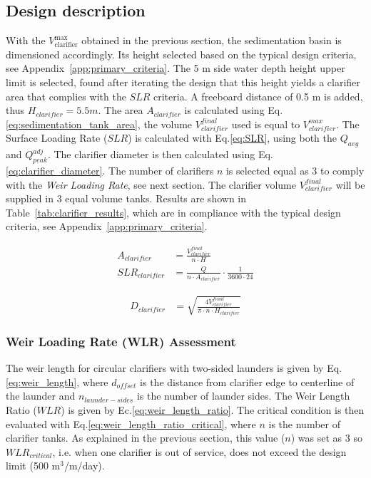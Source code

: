\documentclass[11pt]{article}
\begin{document}
\subsection{Design description}
\label{sec:clarifier_design_description}

With the $V_{\text{clarifier}}^{\text{max}}$ obtained in the previous section, 
the sedimentation basin is dimensioned accordingly. Its height selected based on the typical design criteria, 
see Appendix~\ref{app:primary_criteria}. The 5 m side water depth height upper limit is 
selected, found after iterating the design that this height yields a clarifier 
area that complies with the $SLR$ criteria. A freeboard distance 
of 0.5 m is added, thus $H_{clarifier}=5.5m$. The area $A_{clarifier}$ is calculated
 using Eq.\eqref{eq:sedimentation_tank_area}, the 
volume $V_{clarifier}^{final}$ used is equal to $V_{clarifier}^{max}$.
The Surface Loading Rate ($SLR$) is calculated 
with Eq.\eqref{eq:SLR}, using both the $Q_{avg}$ and $Q_{peak}^{adj}$. 
The clarifier diameter is then 
calculated using Eq.\eqref{eq:clarifier_diameter}. The number of clarifiers $n$ 
is selected equal as 3 to comply with the \textit{Weir Loading Rate}, see next section. 
The clarifier volume $V_{clarifier}^{final}$ will be supplied in 3 equal volume tanks. 
Results are shown in Table~\ref{tab:clarifier_results}, 
which are in compliance with the typical design criteria, see Appendix~\ref{app:primary_criteria}.

\begin{align}
A_{clarifier} &= \frac{V_{clarifier}^{final}}{n \cdot H} 
\label{eq:sedimentation_tank_area}
\\
SLR_{clarifier} &= \frac{Q}{n \cdot A_{clarifier}} \cdot \frac{1}{3600 \cdot 24}
\label{eq:SLR}
\end{align}


\begin{align}
D_{clarifier} &= \sqrt{ \frac{4V_{clarifier}^{final}}{\pi \cdot n \cdot H_{clarifier}} }
\label{eq:clarifier_diameter}
\end{align}

\subsubsection{Weir Loading Rate (WLR) Assessment}

The weir length for circular clarifiers with two-sided launders is given by 
Eq.\eqref{eq:weir_length}, where $d_{offset}$ is the distance from clarifier edge to centerline of the launder
 and $n_{launder-sides}$ is the number of launder sides. 
The Weir Length Ratio ($WLR$) is given by Ec.\eqref{eq:weir_length_ratio}. 
The critical condition is then evaluated with Eq.\eqref{eq:weir_length_ratio_critical}, where $n$ is the
number of clarifier tanks. As explained in the previous section, this value ($n$) was set as 
3 so $WLR_{critical}$, i.e. when one 
clarifier is out of service, does not exceed the design limit (500 m$^3$/m/day). 
\end{document}
